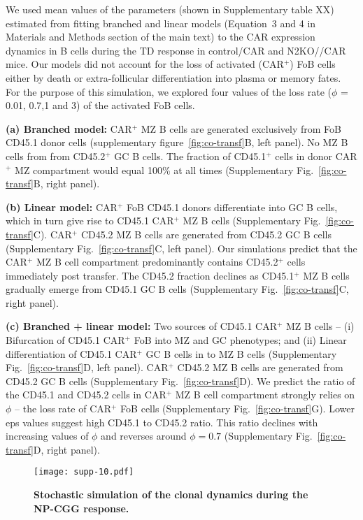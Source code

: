 \documentclass[11pt]{article}
\begin{document}
We used mean values of the parameters (shown in Supplementary table XX) estimated from fitting branched and linear models (Equation~3 and 4 in Materials and Methods section of the main text) to the CAR expression dynamics in B cells during the TD response in control/CAR and N2KO//CAR mice.
Our models did not account for the loss of activated (CAR$^{+}$) FoB cells either by death or extra-follicular differentiation into plasma or memory fates.
For the purpose of this simulation, we explored four values of the loss rate ($\phi$ = 0.01, 0.7,1 and 3) of the activated FoB cells.


\textbf{(a) Branched model:}
CAR$^{+}$  MZ B cells are generated exclusively from FoB CD45.1 donor cells (supplementary figure~\ref{fig:co-transf}B, left panel).
No MZ B cells from from CD45.2$^{+}$ GC B cells.
The fraction of CD45.1$^{+}$ cells in donor CAR$^{+}$ MZ compartment would equal 100\% at all times (Supplementary Fig.~\ref{fig:co-transf}B, right panel).

\textbf{(b) Linear model:}
CAR$^{+}$ FoB CD45.1 donors differentiate into GC B cells, which in turn give rise to CD45.1 CAR$^{+}$ MZ B cells (Supplementary Fig.~\ref{fig:co-transf}C). 
CAR$^{+}$ CD45.2 MZ B cells are generated from CD45.2 GC B cells (Supplementary Fig.~\ref{fig:co-transf}C, left panel).
Our simulations predict that the CAR$^{+}$ MZ B cell compartment predominantly contains CD45.2$^{+}$ cells immediately post transfer.
The CD45.2 fraction declines as CD45.1$^{+}$ MZ B cells gradually emerge from CD45.1 GC B cells (Supplementary Fig.~\ref{fig:co-transf}C, right panel).

\textbf{(c) Branched + linear model:}
Two sources of CD45.1 CAR$^{+}$ MZ B cells -- (i) Bifurcation of CD45.1 CAR$^{+}$ FoB into MZ and GC phenotypes; and (ii)
Linear differentiation of CD45.1 CAR$^{+}$ GC B cells in to MZ B cells  (Supplementary Fig.~\ref{fig:co-transf}D, left panel). 
CAR$^{+}$ CD45.2 MZ B cells are generated from CD45.2 GC B cells (Supplementary Fig.~\ref{fig:co-transf}D).
We predict the ratio of the CD45.1 and CD45.2 cells in CAR$^{+}$ MZ B cell compartment strongly relies on $\phi$ -- the loss rate of CAR$^{+}$ FoB cells (Supplementary Fig.~\ref{fig:co-transf}G).
Lower eps values suggest high CD45.1 to CD45.2 ratio. This ratio declines with increasing values of $\phi$ and reverses around $\phi = 0.7$ (Supplementary Fig.~\ref{fig:co-transf}D, right panel).


 
 
\clearpage

\begin{figure}[htbp]
\center
\texttt{[image: supp-10.pdf]}
\caption{
    \textbf{Stochastic simulation of the clonal dynamics during the NP-CGG response.}
    }
       \label{fig:clone-dyn}
       
 \end{figure}
\end{document}
